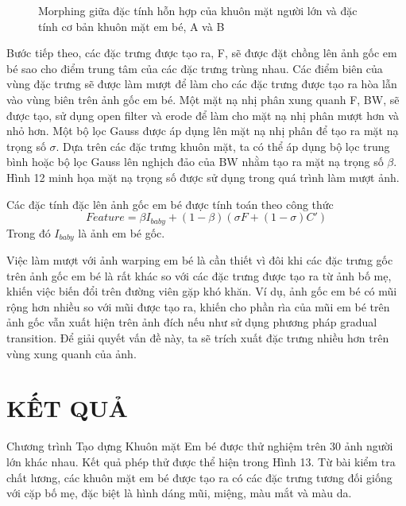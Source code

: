 \documentclass[journal]{IEEEtran}
\begin{document}
\begin{figure}[!t]
\label{refhinh11}
\caption{Morphing giữa đặc tính hỗn hợp của khuôn mặt người lớn và đặc tính cơ bản khuôn mặt em bé, A và B}
\end{figure}
Bước tiếp theo, các đặc trưng được tạo ra, F, sẽ được đặt chồng lên ảnh gốc em bé sao cho điểm trung tâm của các đặc trưng trùng nhau. Các điểm biên của vùng đặc trưng sẽ được làm mượt để làm cho các đặc trưng được tạo ra hòa lẫn vào vùng biên trên ảnh gốc em bé. Một mặt nạ nhị phân xung quanh F, BW, sẽ được tạo, sử dụng open filter và erode để làm cho mặt nạ nhị phân mượt hơn và nhỏ hơn. Một bộ lọc Gauss được áp dụng lên mặt nạ nhị phân để tạo ra mặt nạ trọng số $\sigma$. Dựa trên các đặc trưng khuôn mặt, ta có thể áp dụng bộ lọc trung bình hoặc bộ lọc Gauss lên nghịch đảo của BW nhằm tạo ra mặt nạ trọng số $\beta$. Hình 12 minh họa mặt nạ trọng số được sử dụng trong quá trình làm mượt ảnh.  

Các đặc tính đặc lên ảnh gốc em bé được tính toán theo công thức \[Feature = \beta I_{baby}+(1 - \beta )(\sigma F+(1-\sigma )C')\]
Trong đó $I_{baby}$ là ảnh em bé gốc.

Việc làm mượt với ảnh warping em bé là cần thiết vì đôi khi các đặc trưng gốc trên ảnh gốc em bé là rất khác so với các đặc trưng được tạo ra từ ảnh bố mẹ, khiến việc biến đổi trên đường viên gặp khó khăn. Ví dụ, ảnh gốc em bé có mũi rộng hơn nhiều so với mũi được tạo ra, khiến cho phần rìa của mũi em bé trên ảnh gốc vẫn xuất hiện trên ảnh đích nếu như sử dụng phương pháp gradual transition. Để giải quyết vấn đề này, ta sẽ trích xuất đặc trưng nhiều hơn trên vùng xung quanh của ảnh.

\section{KẾT QUẢ}
Chương trình Tạo dựng Khuôn mặt Em bé được thử nghiệm trên 30 ảnh người lớn khác nhau. Kết quả phép thử được thể hiện trong Hình 13. Từ bài kiểm tra chất lương, các khuôn mặt em bé được tạo ra có các đặc trưng tương đối giống với cặp bố mẹ, đặc biệt là hình dáng mũi, miệng, màu mắt và màu da.
\end{document}
